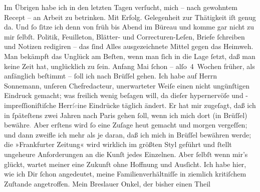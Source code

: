 \pstart
           Im Übrigen habe ich in den letzten Tagen verſucht, mich – nach gewohntem Recept – an
               Arbeit zu betrinken. Mit Erfolg. Gelegenheit zur Thätigkeit iſt genug da. Und{ }ſo{ }ſitze ich denn von früh bis Abend im Büreau und komme  gar nicht zu mir{ }ſelbſt. Politik, Feuilleton, Blätter- und
               Correcturen-Leſen, Briefe{ }ſchreiben und Notizen redigiren – {\pb}das{ }ſind Alles ausgezeichnete Mittel gegen das
               Heimweh. Man bekämpft das Unglück am Beſten, wenn man{ }ſich in die Lage{ }ſetzt, daß man
               keine Zeit hat, unglücklich zu{ }ſein. Anfang Mai{ }ſchon –
               alſo 4 Wochen früher, als anfänglich beſtimmt –{ }ſoll ich nach Brüſſel gehen. Ich habe auf Herrn Sonnemann, unſeren Chefredacteur, unerwarteter Weiſe einen nicht ungünſtigen
               Eindruck gemacht; was freilich wenig beſagen will, da dieſer hypernervöſe und
               -impreſſioniſtiſche Herr\textcolor{gray}{ſe}ine Eindrücke täglich ändert. Er hat mir zugeſagt, daß ich in{ }ſpäteſtens zwei Jahren nach Paris gehen{ }ſoll,
               wenn ich mich dort (in Brüſſel)
                  bewähre\textcolor{gray}{.} Aber erſtens wird{ }ſo eine Zuſage heut gemacht und
               morgen vergeſſen; und dann zweifle ich mehr als je daran, daß ich mich in Brüſſel bewähren {\pb}werde; die »Frankfurter Zeitung« wird wirklich
               im größten Styl geführt und{ }ſtellt ungeheure Anforderungen an die Kunſt jedes
               Einzelnen. Aber{ }ſelbſt wenn mir’s glückt, wartet meiner eine Zukunft ohne Hoffnung
               und Ausſicht. Ich habe hier,
               wie ich Dir{ }ſchon angedeutet, meine Familienverhältniſſe in ziemlich kritiſchem
               Zuſtande angetroffen. Mein Breslauer Onkel, der bisher einen Theil
